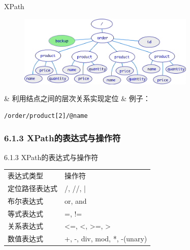 \begin{frame}[fragile]{XPath}
\begin{figure}
    \includegraphics[width=0.75\textwidth]{figure/xpath-tree.png}
\end{figure}
\begin{easylist} \easyitem
& 利用结点之间的层次关系实现定位
& 例子：
\begin{lstlisting}[tabsize=8, basicstyle=\small\tt, language=XML, numbers=none]
/order/product[2]/@name
\end{lstlisting}
\end{easylist}
\end{frame}


\subsubsection{6.1.3 XPath的表达式与操作符}
\begin{frame}[fragile]{6.1.3 XPath的表达式与操作符}
\begin{table}[!hbp] 
\begin{tabular}{l|l}
\Xhline{1.3pt}
表达式类型 &	操作符 \\ \Xhline{1.3pt}
定位路径表达式& /,  //,  |  \\ \hline
布尔表达式 & or,   and  \\ \hline
等式表达式 & =,   !=  \\ \hline
关系表达式 &	<=,  <,  >=,  >  \\ \hline
数值表达式 & 	+,  -,  div,  mod,  *,  -(unary)  \\ \hline
\end{tabular}
\end{table}
\end{frame}


